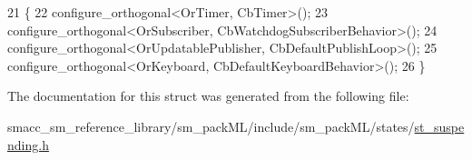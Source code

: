 \begin{DoxyCode}
21     \{
22         configure\_orthogonal<OrTimer, CbTimer>();   
23         configure\_orthogonal<OrSubscriber, CbWatchdogSubscriberBehavior>();
24         configure\_orthogonal<OrUpdatablePublisher, CbDefaultPublishLoop>();
25         configure\_orthogonal<OrKeyboard, CbDefaultKeyboardBehavior>();
26     \}
\end{DoxyCode}


The documentation for this struct was generated from the following file\+:\begin{DoxyCompactItemize}
\item 
smacc\+\_\+sm\+\_\+reference\+\_\+library/sm\+\_\+pack\+M\+L/include/sm\+\_\+pack\+M\+L/states/\hyperlink{st__suspending_8h}{st\+\_\+suspending.\+h}\end{DoxyCompactItemize}
